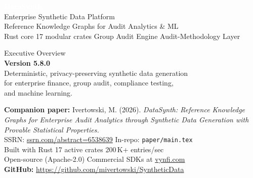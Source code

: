 \documentclass[11pt,a4paper]{article}
\newcommand{\dsversion}{5.8.0}
\newcommand{\dsrepourl}{https://github.com/mivertowski/SyntheticData}
\newcommand{\dsssrnurl}{https://ssrn.com/abstract=6538639}
\begin{document}
\begin{titlepage}

\vspace*{1.5cm}
\begin{flushleft}
  {\fontsize{38}{44}\selectfont\bfseries\textcolor{white}{DataSynth}}\\[0.5em]
  {\fontsize{16}{20}\selectfont\textcolor{white!85}{Enterprise Synthetic Data Platform}}\\[0.3em]
  {\large\textcolor{white!65}{Reference Knowledge Graphs for Audit Analytics \& ML}}\\[0.3em]
  {\normalsize\textcolor{white!50}{Rust core \textbullet{} 17 modular crates \textbullet{}
    Group Audit Engine \textbullet{} Audit-Methodology Layer}}
\end{flushleft}

\vspace{5.5cm}

\begin{flushleft}
  \textcolor{midgray}{\large Executive Overview}\\[0.8em]
  {\Large\textcolor{brand}{\textbf{Version \dsversion}}}\\[1.5em]
  \textcolor{midgray}{%
    Deterministic, privacy-preserving synthetic data generation\\
    for enterprise finance, group audit, compliance testing,\\
    and machine learning.%
  }
\end{flushleft}

\vfill
\begin{flushleft}
  \textcolor{midgray}{\small
    \textbf{Companion paper:} Ivertowski, M. (2026).
    \textit{DataSynth: Reference Knowledge Graphs for Enterprise Audit Analytics
    through Synthetic Data Generation with Provable Statistical Properties.}\\
    SSRN: \href{\dsssrnurl}{ssrn.com/abstract=6538639}
    \textbullet{} In-repo: \texttt{paper/main.tex}\\[6pt]
    Built with Rust \textbullet{} 17 active crates \textbullet{} 200\,K+ entries/sec\\[4pt]
    Open-source (Apache-2.0) \textbullet{} Commercial SDKs at
    \href{https://vynfi.com}{vynfi.com}\\[4pt]
    \textbf{GitHub:} \url{\dsrepourl}
  }
\end{flushleft}
\end{titlepage}
\end{document}

